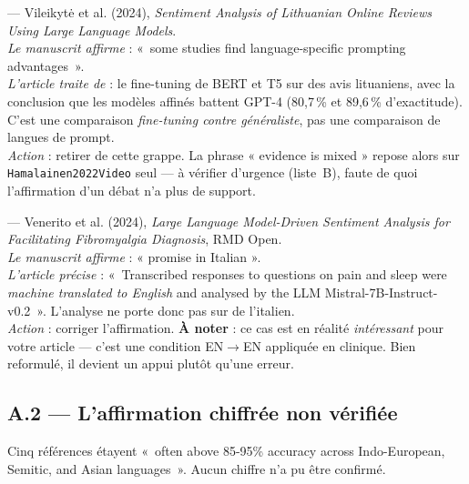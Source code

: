 \documentclass[11pt,a4paper]{article}
\newcommand{\ko}{\textcolor{crit}{\textbf{$\times$}}}
\newcommand{\att}{\textcolor{warn}{\textbf{!}}}
\newcommand{\cle}[1]{\texttt{\small #1}}
\begin{document}
\begin{description}[leftmargin=0pt,style=unboxed]
\item[\ko~\cle{Vileikyte2024Sentiment}] --- Vileikytė et al. (2024),
\emph{Sentiment Analysis of Lithuanian Online Reviews Using Large Language
Models}.\\
\textit{Le manuscrit affirme} : «~some studies find language-specific prompting
advantages~».\\
\textit{L'article traite de} : le fine-tuning de BERT et T5 sur des avis
lituaniens, avec la conclusion que les modèles affinés battent GPT-4 (80,7\,\%
et 89,6\,\% d'exactitude). C'est une comparaison \emph{fine-tuning contre
généraliste}, pas une comparaison de langues de prompt.\\
\textit{Action} : retirer de cette grappe. La phrase « evidence is mixed »
repose alors sur \cle{Hamalainen2022Video} seul --- à vérifier d'urgence
(liste~B), faute de quoi l'affirmation d'un débat n'a plus de support.

\item[\att~\cle{Venerito2024Large}] --- Venerito et al. (2024), \emph{Large
Language Model-Driven Sentiment Analysis for Facilitating Fibromyalgia
Diagnosis}, RMD Open.\\
\textit{Le manuscrit affirme} : « promise in Italian ».\\
\textit{L'article précise} : «~Transcribed responses to questions on pain and
sleep were \emph{machine translated to English} and analysed by the LLM
Mistral-7B-Instruct-v0.2~». L'analyse ne porte donc pas sur de l'italien.\\
\textit{Action} : corriger l'affirmation. \textbf{À noter} : ce cas est en
réalité \emph{intéressant} pour votre article --- c'est une condition
EN$\rightarrow$EN appliquée en clinique. Bien reformulé, il devient un appui
plutôt qu'une erreur.

\end{description}

\subsection*{A.2 --- L'affirmation chiffrée non vérifiée}

Cinq références étayent «~often above 85-95\% accuracy across Indo-European,
Semitic, and Asian languages~». Aucun chiffre n'a pu être confirmé.
\end{document}
